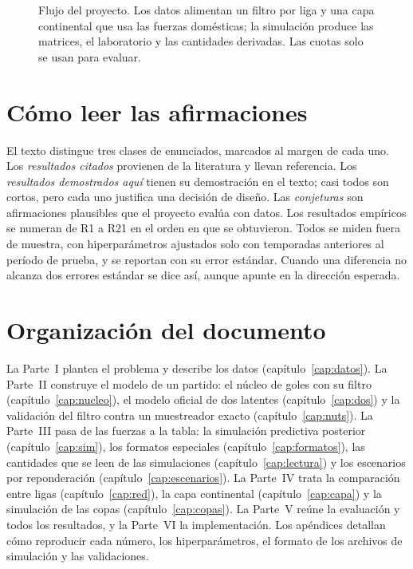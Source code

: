 \begin{figure}[t]
\caption{Flujo del proyecto. Los datos alimentan un filtro por liga y una capa continental que usa las fuerzas domésticas; la simulación produce las matrices, el laboratorio y las cantidades derivadas. Las cuotas solo se usan para evaluar.}
\label{fig:flujo}
\end{figure}

\section{Cómo leer las afirmaciones}

El texto distingue tres clases de enunciados, marcados al margen de cada uno. Los \emph{resultados citados} \lit provienen de la literatura y llevan referencia. Los \emph{resultados demostrados aquí} \dem tienen su demostración en el texto; casi todos son cortos, pero cada uno justifica una decisión de diseño. Las \emph{conjeturas} \conj son afirmaciones plausibles que el proyecto evalúa con datos. Los resultados empíricos se numeran de R1 a R21 en el orden en que se obtuvieron. Todos se miden fuera de muestra, con hiperparámetros ajustados solo con temporadas anteriores al período de prueba, y se reportan con su error estándar. Cuando una diferencia no alcanza dos errores estándar se dice así, aunque apunte en la dirección esperada.

\section{Organización del documento}

La Parte~I plantea el problema y describe los datos (capítulo~\ref{cap:datos}). La Parte~II construye el modelo de un partido: el núcleo de goles con su filtro (capítulo~\ref{cap:nucleo}), el modelo oficial de dos latentes (capítulo~\ref{cap:dos}) y la validación del filtro contra un muestreador exacto (capítulo~\ref{cap:nuts}). La Parte~III pasa de las fuerzas a la tabla: la simulación predictiva posterior (capítulo~\ref{cap:sim}), los formatos especiales (capítulo~\ref{cap:formatos}), las cantidades que se leen de las simulaciones (capítulo~\ref{cap:lectura}) y los escenarios por reponderación (capítulo~\ref{cap:escenarios}). La Parte~IV trata la comparación entre ligas (capítulo~\ref{cap:red}), la capa continental (capítulo~\ref{cap:capa}) y la simulación de las copas (capítulo~\ref{cap:copas}). La Parte~V reúne la evaluación y todos los resultados, y la Parte~VI la implementación. Los apéndices detallan cómo reproducir cada número, los hiperparámetros, el formato de los archivos de simulación y las validaciones.

